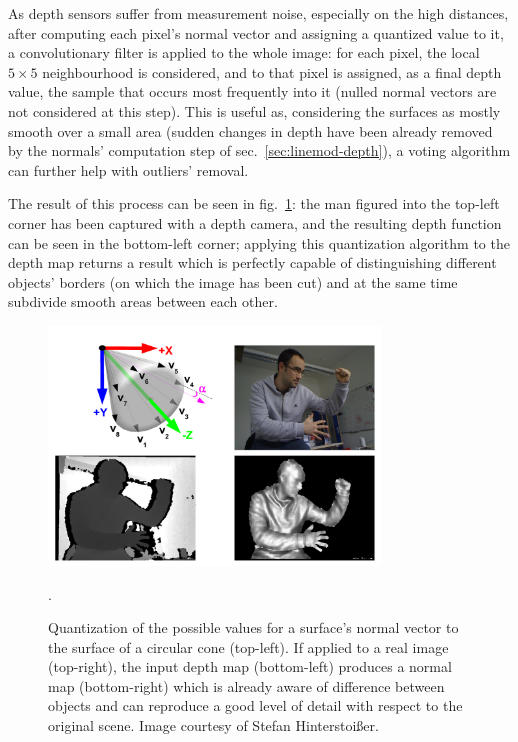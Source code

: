 As depth sensors suffer from measurement noise, especially on the high
distances, after computing each pixel's normal vector and assigning a
quantized value to it, a convolutionary filter is applied to the whole
image: for each pixel, the local $5\times 5$ neighbourhood is
considered, and to that pixel is assigned, as a final depth value, the
sample that occurs most frequently into it (nulled normal vectors are
not considered at this step). This is useful as,
considering the surfaces as mostly smooth over a small area (sudden
changes in depth have been already removed by the normals' computation
step of sec.~\ref{sec:linemod-depth}), a voting algorithm can further
help with outliers' removal.

The result of this process can be seen in fig.~\ref{fig:depth-man}:
the man figured into the top-left corner has been captured with a
depth camera, and the resulting depth function can be seen in the
bottom-left corner; applying this quantization algorithm to the depth
map returns a result which is perfectly capable of distinguishing
different objects' borders (on which the image has been cut) and at
the same time subdivide smooth areas between each other.

\begin{figure}[htbp]
\centering
\includegraphics[height=2.5in]{./Graphics/depth-man}
\caption{Quantization of the possible values for a surface's normal
  vector to the surface of a circular cone (top-left). If applied to a
  real image (top-right), the input depth map (bottom-left) produces a
  normal map (bottom-right) which is already aware of difference
  between objects and can reproduce a good level of detail with
  respect to the original scene. Image courtesy of Stefan Hinterstoi\ss er. \label{fig:depth-man}}.
\end{figure}

